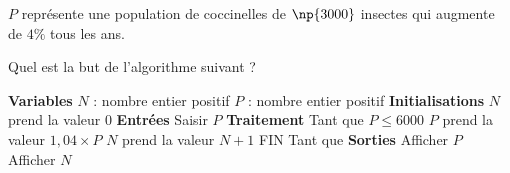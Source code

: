 \documentclass[12pt,openright,twoside,french]{book}
\begin{document}
\exo$P$ représente une population de coccinelles de $\np{3000}$ insectes qui augmente de $4\%$ tous les ans.\par
Quel est la but de l'algorithme suivant ?\medskip

{\obeylines
\textbf{Variables}
	\quad $N$ : nombre entier positif
	\quad $P$ : nombre entier positif \smallskip
\textbf{Initialisations}
	\quad $N$ prend la valeur $0$\smallskip
\textbf{Entrées}
	\quad Saisir $P$\smallskip
\textbf{Traitement}
	\quad Tant que $P\leq 6000$
		\qquad $P$ prend la valeur $1,04 \times P$
		\qquad $N$ prend la valeur $N+1$
	\quad FIN Tant que\smallskip
\textbf{Sorties}
	\quad Afficher $P$
	\quad Afficher $N$
}
\end{document}
